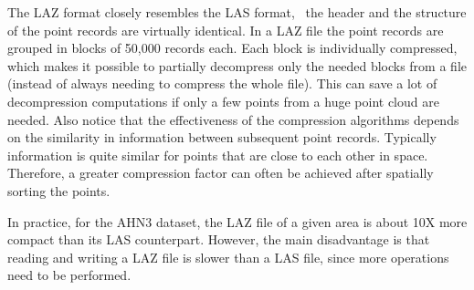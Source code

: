 The LAZ format closely resembles the LAS format, \ie\ the header and the structure of the point records are virtually identical.
In a LAZ file the point records are grouped in blocks of 50,000 records each.
Each block is individually compressed, which makes it possible to partially decompress only the needed blocks from a file (instead of always needing to compress the whole file).
This can save a lot of decompression computations if only a few points from a huge point cloud are needed.
Also notice that the effectiveness of the compression algorithms depends on the similarity in information between subsequent point records.
Typically information is quite similar for points that are close to each other in space.
Therefore, a greater compression factor can often be achieved after spatially sorting the points.

In practice, for the AHN3 dataset, the LAZ file of a given area is about 10X more compact than its LAS counterpart.
However, the main disadvantage is that reading and writing a LAZ file is slower than a LAS file, since more operations need to be performed.

